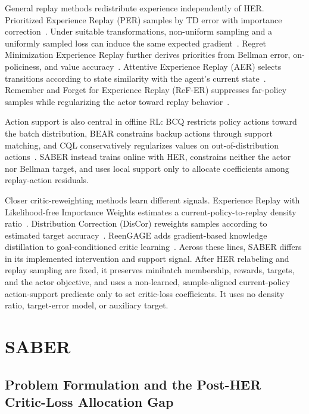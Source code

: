 \documentclass[letterpaper]{article}
\begin{document}
General replay methods redistribute experience independently of HER. Prioritized Experience Replay (PER) samples by TD error with importance correction~\citep{schaul2016per}. Under suitable transformations, non-uniform sampling and a uniformly sampled loss can induce the same expected gradient~\citep{fujimoto2020equivalence}. Regret Minimization Experience Replay further derives priorities from Bellman error, on-policiness, and value accuracy~\citep{liu2021regret}. Attentive Experience Replay (AER) selects transitions according to state similarity with the agent's current state~\citep{sun2020aer}. Remember and Forget for Experience Replay (ReF-ER) suppresses far-policy samples while regularizing the actor toward replay behavior~\citep{novati2019refer}.

Action support is also central in offline RL: BCQ restricts policy actions toward the batch distribution, BEAR constrains backup actions through support matching, and CQL conservatively regularizes values on out-of-distribution actions~\citep{fujimoto2019bcq,kumar2019bear,kumar2020cql}. SABER instead trains online with HER, constrains neither the actor nor Bellman target, and uses local support only to allocate coefficients among replay-action residuals.

Closer critic-reweighting methods learn different signals. Experience Replay with Likelihood-free Importance Weights estimates a current-policy-to-replay density ratio~\citep{sinha2022lfiw}. Distribution Correction (DisCor) reweights samples according to estimated target accuracy~\citep{kumar2020discor}. ReenGAGE adds gradient-based knowledge distillation to goal-conditioned critic learning~\citep{levine2023reengage}. Across these lines, SABER differs in its implemented intervention and support signal. After HER relabeling and replay sampling are fixed, it preserves minibatch membership, rewards, targets, and the actor objective, and uses a non-learned, sample-aligned current-policy action-support predicate only to set critic-loss coefficients. It uses no density ratio, target-error model, or auxiliary target.

\section{SABER}\label{sec:saber}

\subsection{Problem Formulation and the Post-HER Critic-Loss Allocation Gap}
\end{document}
